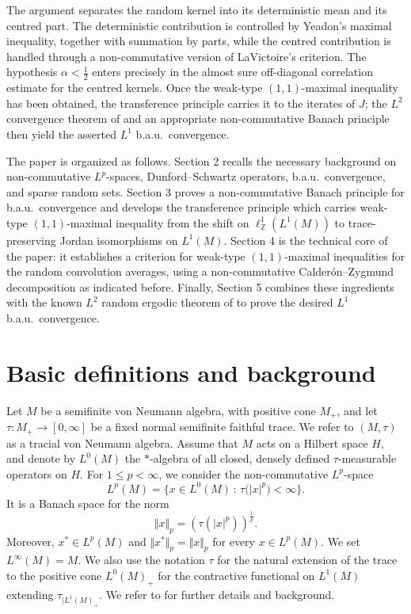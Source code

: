 \documentclass[12pt]{amsart}
\newcommand{\norm}[1]{\Vert#1\Vert}
\theoremstyle{remark}
\theoremstyle{definition}
\numberwithin{equation}{section}
\begin{document}
The argument separates the random kernel into its deterministic mean and its
centred part. The deterministic contribution is controlled by Yeadon's
maximal inequality, together with summation by parts, while the centred
contribution is handled through a non-commutative version of LaVictoire's  criterion. The hypothesis $\alpha<\frac12$ enters precisely in
the almost sure off-diagonal correlation estimate for the centred kernels.
Once the weak-type $(1,1)$-maximal inequality has been obtained, the transference principle carries it to the iterates of $J$; the
$L^2$ convergence theorem of \cite{LZ} and an appropriate 
non-commutative Banach
principle then yield the asserted $L^1$ b.a.u.\ convergence.

The paper is organized as follows. Section 2 recalls the necessary background
on non-commutative $L^p$-spaces, Dunford--Schwartz operators, b.a.u.\ convergence, and sparse random sets. Section 3 proves a
non-commutative Banach principle for b.a.u.\ convergence and develops the
transference principle which carries weak-type $(1,1)$-maximal inequality from the
shift on $\ell^1_{\mathbb Z}(L^1(M))$ to trace-preserving Jordan
isomorphisms on $L^1(M)$. Section 4 is the technical core of the paper: it
establishes a criterion for weak-type $(1,1)$-maximal 
inequalities for the
random convolution averages, using a non-commutative
Calder\'on--Zygmund decomposition as indicated before. 
Finally, Section 5
combines these ingredients with the known 
$L^2$ random ergodic theorem of
\cite{LZ} to prove the desired $L^1$ b.a.u.\ convergence.\\


\section{Basic definitions and background}\label{1}

Let $M$ be a semifinite von Neumann algebra, with positive cone $M_+$,
and let $\tau\colon M_+\to[0,\infty]$ be a fixed normal semifinite
faithful trace. We refer to $(M,\tau)$ as a tracial von Neumann algebra.
Assume that $M$ acts on a Hilbert space $H$, and denote by $L^0(M)$ the
$*$-algebra of all closed, densely defined $\tau$-measurable operators on
$H$. For $1\leq p<\infty$, we consider the non-commutative $L^p$-space
$$
L^p(M)=\bigl\{x\in L^0(M)\,:\,\tau\bigl(\vert x\vert^p\bigr)<\infty\bigr\}.
$$
It is a Banach space for the norm
$$
\norm{x}_p=(\tau(\vert x\vert^p))^{\frac1p}.
$$
Moreover, $x^*\in L^p(M)$ and $\norm{x^*}_p=\norm{x}_p$ for every
$x\in L^p(M)$. We set $L^\infty(M)=M$. We also use the notation $\tau$ 
for the natural extension of the trace to the positive cone
$L^0(M)_+$  for the contractive functional
on $L^1(M)$ extending $\tau_{\vert L^1(M)_+}$.
We refer to \cite{Hiai,PX} for further
details and background.
\end{document}
